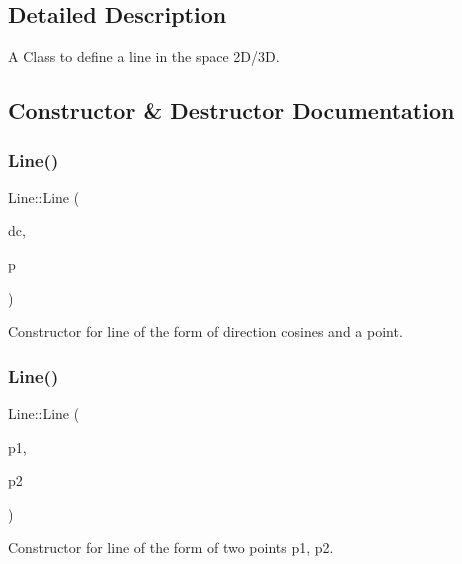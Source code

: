\subsection{Detailed Description}
A Class to define a line in the space 2\+D/3D. 

\subsection{Constructor \& Destructor Documentation}
\mbox{\label{class_line_ae24f583f6e61000f88a20205e9b7cf1c}} 
\subsubsection{\texorpdfstring{Line()}{Line()}\hspace{0.1cm}{\footnotesize\ttfamily [1/2]}}
{\footnotesize\ttfamily Line\+::\+Line (\begin{DoxyParamCaption}\item[{\mbox{\hyperlink{class_direction_cosines}{Direction\+Cosines}}}]{dc,  }\item[{\mbox{\hyperlink{class_point}{Point}}}]{p }\end{DoxyParamCaption})}



Constructor for line of the form of direction cosines and a point. 

\mbox{\label{class_line_afeaa676c7d249d582c5766dc732a78e2}} 
\subsubsection{\texorpdfstring{Line()}{Line()}\hspace{0.1cm}{\footnotesize\ttfamily [2/2]}}
{\footnotesize\ttfamily Line\+::\+Line (\begin{DoxyParamCaption}\item[{\mbox{\hyperlink{class_point}{Point}}}]{p1,  }\item[{\mbox{\hyperlink{class_point}{Point}}}]{p2 }\end{DoxyParamCaption})}



Constructor for line of the form of two points p1, p2. 

\mbox{\label{class_line_aabe85f48d22d92b62257091f48174fac}} 
